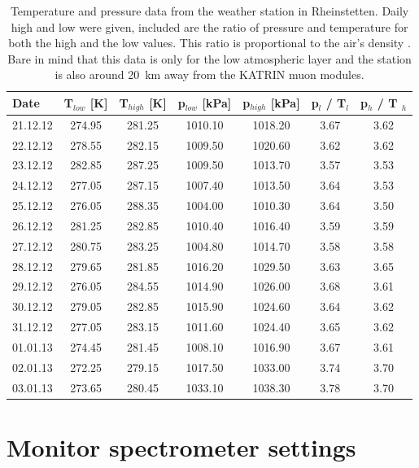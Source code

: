 \begin{table}[h]
	\begin{tabular}{| l | cc | cc| cc |}
	\hline
	Date & T$_{low}$ [K] & T$_{high}$ [K] & p$_{low}$ [kPa] & p$_{high}$ [kPa] & p$_l$ / T$_l$ & p$_h$ / T $_h$ \\
	\hline
	21.12.12 & 274.95 & 281.25 & 1010.10 & 1018.20 & 3.67 & 3.62\\
	22.12.12 & 278.55 & 282.15 & 1009.50 & 1020.60 & 3.62 & 3.62\\
	23.12.12 & 282.85 & 287.25 & 1009.50 & 1013.70 & 3.57 & 3.53\\
	24.12.12 & 277.05 & 287.15 & 1007.40 & 1013.50 & 3.64 & 3.53\\
	25.12.12 & 276.05 & 288.35 & 1004.00 & 1010.30 & 3.64 & 3.50\\
	26.12.12 & 281.25 & 282.85 & 1010.40 & 1016.40 & 3.59 & 3.59\\
	27.12.12 & 280.75 & 283.25 & 1004.80 & 1014.70 & 3.58 & 3.58\\
	28.12.12 & 279.65 & 281.85 & 1016.20 & 1029.50 & 3.63 & 3.65\\
	29.12.12 & 276.05 & 284.55 & 1014.90 & 1026.00 & 3.68 & 3.61\\
	30.12.12 & 279.05 & 282.85 & 1015.90 & 1024.60 & 3.64 & 3.62\\
	31.12.12 & 277.05 & 283.15 & 1011.60 & 1024.40 & 3.65 & 3.62\\
	01.01.13 & 274.45 & 281.45 & 1008.10 & 1016.90 & 3.67 & 3.61\\
	02.01.13 & 272.25 & 279.15 & 1017.50 & 1033.00 & 3.74 & 3.70\\
	03.01.13 & 273.65 & 280.45 & 1033.10 & 1038.30 & 3.78 & 3.70\\
	\hline
	
	\end{tabular}
	\caption[Temperature and pressure Rheinstetten]{Temperature and pressure data from the weather station in Rheinstetten. Daily high and low were given, included are the ratio of pressure and temperature for both the high and the low values. This ratio is proportional to the air's density . Bare in mind that this data is only for the low atmospheric layer and the station is also around \SI{20}{\kilo\meter} away  from the KATRIN muon modules.}
	\label{fig:weatherData}
\end{table}

\clearpage


\section{Monitor spectrometer settings}
\label{ch:annex:sec:monSpec}

